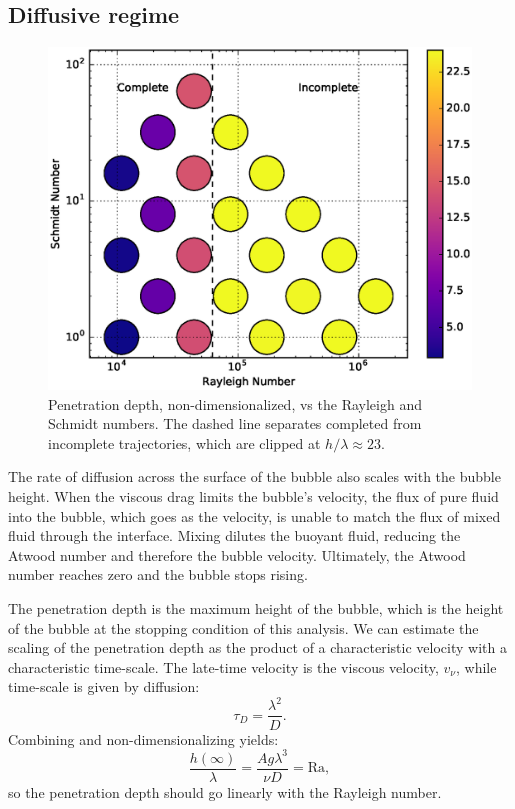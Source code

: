 \subsection{Diffusive regime}
\begin{figure}
\includegraphics[width=\columnwidth]{figs/PenetrationDepth-vs-Rayleigh-Schmidt}
\caption{ 
  Penetration depth, non-dimensionalized, vs the Rayleigh and Schmidt numbers.
  The dashed line separates completed from incomplete trajectories, which are clipped at $h/\lambda \approx 23$.
}
\end{figure}

The rate of diffusion across the surface of the bubble also scales with the bubble height.
When the viscous drag limits the bubble's velocity, the flux of pure fluid into the bubble, which goes as the velocity, is unable to match the flux of mixed fluid through the interface.
Mixing dilutes the buoyant fluid, reducing the Atwood number and therefore the bubble velocity.
Ultimately, the Atwood number reaches zero and the bubble stops rising.

The penetration depth is the maximum height of the bubble, which is the height of the bubble at the stopping condition of this analysis.
We can estimate the scaling of the penetration depth as the product of a characteristic velocity with a characteristic time-scale.
The late-time velocity is the viscous velocity, $v_\nu$, while time-scale is given by diffusion:
\begin{equation}
\tau_D = \frac{\lambda^2}{D}.
\end{equation}
Combining and non-dimensionalizing yields:
\begin{equation}
\frac{h(\infty)}{\lambda} = \frac{A g \lambda^3}{\nu D} = \text{Ra},
\end{equation}
so the penetration depth should go linearly with the Rayleigh number.


